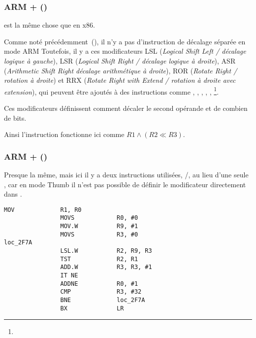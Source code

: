 \subsubsection{ARM + \OptimizingXcodeIV (\ARMMode)}



\TST est la même chose que \TEST en x86.

Comme noté précédemment~(), il n'y a pas d'instruction
de décalage séparée en mode ARM
Toutefois, il y a ces modificateurs
LSL (\emph{Logical Shift Left / décalage logique à gauche}), 
LSR (\emph{Logical Shift Right / décalage logique à droite}), 
ASR (\emph{Arithmetic Shift Right décalage arithmétique à droite}), 
ROR (\emph{Rotate Right / rotation à droite}) et
RRX (\emph{Rotate Right with Extend / rotation à droite avec extension}),
qui peuvent être ajoutés à des instructions comme \MOV, \TST,
\CMP, \ADD, \SUB, \RSB\footnote{\DataProcessingInstructionsFootNote}.

Ces modificateurs définissent comment décaler le second opérande et de combien de
bits.

Ainsi l'instruction  fonctionne ici comme $R1 \land (R2
\ll R3)$.

\subsubsection{ARM + \OptimizingXcodeIV (\ThumbTwoMode)}

Presque la même, mais ici il y a deux instructions utilisées, /\TST, au
lieu d'une seule \TST, car en mode Thumb il n'est pas possible de définir le modificateur
\LSL directement dans \TST.

\begin{lstlisting}[label=ARM_leaf_example5,style=customasmARM]
                MOV             R1, R0
                MOVS            R0, #0
                MOV.W           R9, #1
                MOVS            R3, #0
loc_2F7A
                LSL.W           R2, R9, R3
                TST             R2, R1
                ADD.W           R3, R3, #1
                IT NE
                ADDNE           R0, #1
                CMP             R3, #32
                BNE             loc_2F7A
                BX              LR
\end{lstlisting}

